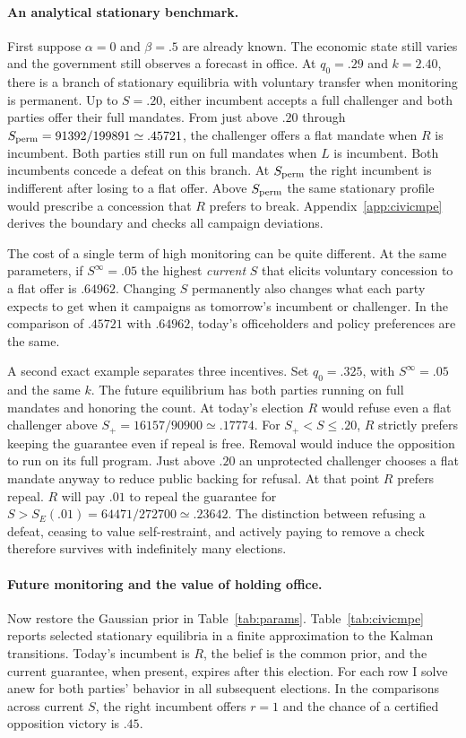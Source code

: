 \documentclass[11pt,letterpaper]{article}
\begin{document}
\paragraph{An analytical stationary benchmark.}
First suppose $\alpha=0$ and $\beta=.5$ are already known. The economic state still varies and the government still observes a forecast in office. At $q_0=.29$ and $k=2.40$, there is a branch of stationary equilibria with voluntary transfer when monitoring is permanent. Up to $S=.20$, either incumbent accepts a full challenger and both parties offer their full mandates. From just above $.20$ through $S_{\rm perm}=91392/199891\simeq .45721$, the challenger offers a flat mandate when $R$ is incumbent. Both parties still run on full mandates when $L$ is incumbent. Both incumbents concede a defeat on this branch. At $S_{\rm perm}$ the right incumbent is indifferent after losing to a flat offer. Above $S_{\rm perm}$ the same stationary profile would prescribe a concession that $R$ prefers to break. Appendix~\ref{app:civicmpe} derives the boundary and checks all campaign deviations.

The cost of a single term of high monitoring can be quite different. At the same parameters, if $S^\infty=.05$ the highest \emph{current} $S$ that elicits voluntary concession to a flat offer is $.64962$. Changing $S$ permanently also changes what each party expects to get when it campaigns as tomorrow's incumbent or challenger. In the comparison of $.45721$ with $.64962$, today's officeholders and policy preferences are the same.

A second exact example separates three incentives. Set $q_0=.325$, with $S^\infty=.05$ and the same $k$. The future equilibrium has both parties running on full mandates and honoring the count. At today's election $R$ would refuse even a flat challenger above $S_+=16157/90900\simeq .17774$. For $S_+<S\le .20$, $R$ strictly prefers keeping the guarantee even if repeal is free. Removal would induce the opposition to run on its full program. Just above $.20$ an unprotected challenger chooses a flat mandate anyway to reduce public backing for refusal. At that point $R$ prefers repeal. $R$ will pay $.01$ to repeal the guarantee for $S>S_E(.01)=64471/272700\simeq .23642$. The distinction between refusing a defeat, ceasing to value self-restraint, and actively paying to remove a check therefore survives with indefinitely many elections.

\paragraph{Future monitoring and the value of holding office.}
Now restore the Gaussian prior in Table~\ref{tab:params}. Table~\ref{tab:civicmpe} reports selected stationary equilibria in a finite approximation to the Kalman transitions. Today's incumbent is $R$, the belief is the common prior, and the current guarantee, when present, expires after this election. For each row I solve anew for both parties' behavior in all subsequent elections. In the comparisons across current $S$, the right incumbent offers $r=1$ and the chance of a certified opposition victory is $.45$.
\end{document}
